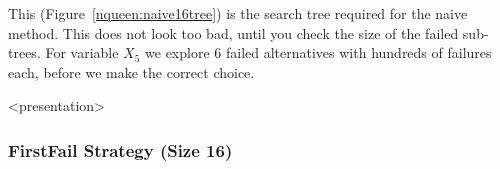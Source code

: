 This (Figure~\ref{nqueen:naive16tree}) is the search tree required for the naive method. This does not look too bad, until you check the size of the failed sub-trees. For variable $X_5$ we explore 6 failed alternatives with hundreds of failures each, before we make the correct choice.

\begin{frame}<presentation>
\frametitle{FirstFail Strategy (Size 16)}
\end{frame}
